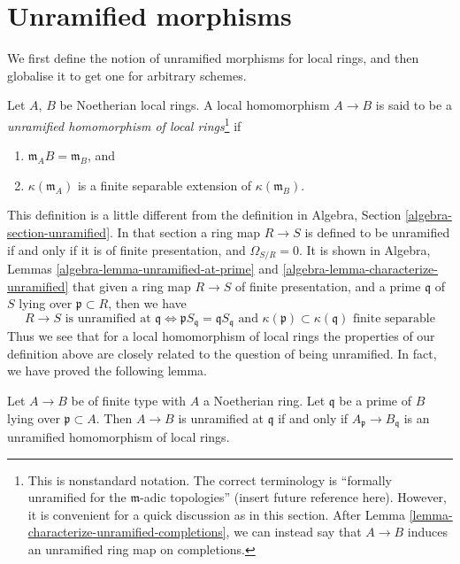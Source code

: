 \section{Unramified morphisms}
\label{section-unramified-definition}

\noindent
We first define the notion of unramified morphisms for local rings, and then
globalise it to get one for arbitrary schemes.

\begin{definition}
\label{definition-unramified-rings}
Let $A$, $B$ be Noetherian local rings. A local homomorphism $A \to B$
is said to be a {\it unramified homomorphism of local rings}\footnote{%
This is nonstandard notation. The correct terminology is
``formally unramified for the $\mathfrak m$-adic topologies''
(insert future reference here). However, it is convenient for a quick
discussion as in this section. After
Lemma \ref{lemma-characterize-unramified-completions}, we can instead say
that $A \to B$ induces an unramified ring map on completions.}
if
\begin{enumerate}
\item $\mathfrak m_AB = \mathfrak m_B$, and
\item $\kappa(\mathfrak m_A)$ is a finite separable extension of
$\kappa(\mathfrak m_B)$.
\end{enumerate}
\end{definition}

\noindent
This definition is a little different from the
definition in Algebra, Section \ref{algebra-section-unramified}.
In that section a ring map $R \to S$ is defined to be unramified if and
only if it is of finite presentation, and $\Omega_{S/R} = 0$.
It is shown in
Algebra, Lemmas \ref{algebra-lemma-unramified-at-prime} and
\ref{algebra-lemma-characterize-unramified} that given a ring
map $R \to S$ of finite presentation, and a prime $\mathfrak q$ of $S$
lying over $\mathfrak p \subset R$, then we have
$$
R \to S\text{ is unramified at }\mathfrak q
\Leftrightarrow
\mathfrak pS_{\mathfrak q} = \mathfrak q S_{\mathfrak q}
\text{ and }
\kappa(\mathfrak p) \subset \kappa(\mathfrak q)\text{ finite separable}
$$
Thus we see that for a local homomorphism of local rings the properties
of our definition above are closely related to the question of
being unramified. In fact, we have proved the following lemma.

\begin{lemma}
\label{lemma-characterize-unramified-Noetherian}
Let $A \to B$ be of finite type with $A$ a Noetherian ring.
Let $\mathfrak q$ be a prime of $B$ lying over $\mathfrak p \subset A$.
Then $A \to B$ is unramified at $\mathfrak q$ if and only if
$A_{\mathfrak p} \to B_{\mathfrak q}$ is an unramified homomorphism
of local rings.
\end{lemma}

